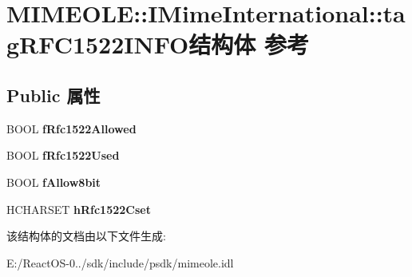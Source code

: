 \hypertarget{struct_m_i_m_e_o_l_e_1_1_i_mime_international_1_1tag_r_f_c1522_i_n_f_o}{}\section{M\+I\+M\+E\+O\+LE\+:\+:I\+Mime\+International\+:\+:tag\+R\+F\+C1522\+I\+N\+F\+O结构体 参考}
\label{struct_m_i_m_e_o_l_e_1_1_i_mime_international_1_1tag_r_f_c1522_i_n_f_o}
\subsection*{Public 属性}
\begin{DoxyCompactItemize}
\item 
\mbox{\label{struct_m_i_m_e_o_l_e_1_1_i_mime_international_1_1tag_r_f_c1522_i_n_f_o_a10e7f1044b83b24306c42606d2599fea}} 
B\+O\+OL {\bfseries f\+Rfc1522\+Allowed}
\item 
\mbox{\label{struct_m_i_m_e_o_l_e_1_1_i_mime_international_1_1tag_r_f_c1522_i_n_f_o_a6bc53cbb8a18d56efe528ecfdf853a7f}} 
B\+O\+OL {\bfseries f\+Rfc1522\+Used}
\item 
\mbox{\label{struct_m_i_m_e_o_l_e_1_1_i_mime_international_1_1tag_r_f_c1522_i_n_f_o_ae970207be6e1adba727e8f8381866e12}} 
B\+O\+OL {\bfseries f\+Allow8bit}
\item 
\mbox{\label{struct_m_i_m_e_o_l_e_1_1_i_mime_international_1_1tag_r_f_c1522_i_n_f_o_af74f971bde663be9b70b90d84b37dfe1}} 
H\+C\+H\+A\+R\+S\+ET {\bfseries h\+Rfc1522\+Cset}
\end{DoxyCompactItemize}


该结构体的文档由以下文件生成\+:\begin{DoxyCompactItemize}
\item 
E\+:/\+React\+O\+S-\/0../sdk/include/psdk/mimeole.\+idl\end{DoxyCompactItemize}
